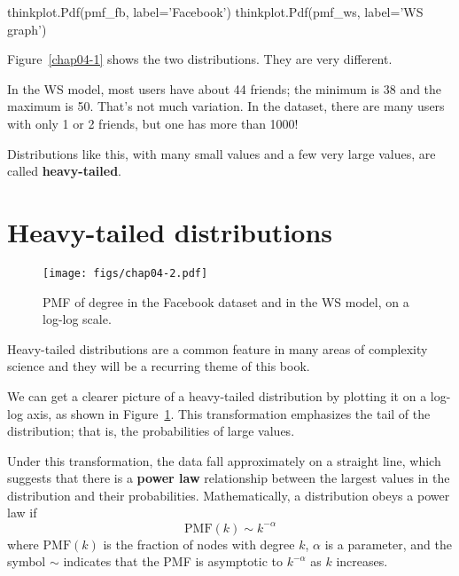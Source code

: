\documentclass[12pt]{book}
\theoremstyle{exercise}
\begin{document}
\begin{code}
thinkplot.Pdf(pmf_fb, label='Facebook')
thinkplot.Pdf(pmf_ws, label='WS graph')
\end{code}

Figure~\ref{chap04-1} shows the two distributions.  They are
very different.


In the WS model, most users have about 44 friends; the minimum is 38
and the maximum is 50.  That's not much variation.
In the dataset, there are many users with only 1 or 2 friends,
but one has more than 1000!


Distributions like this, with many small values and a few very large
values, are called {\bf heavy-tailed}.


\section{Heavy-tailed distributions}
\label{heavytail}

\begin{figure}
\centerline{\texttt{[image: figs/chap04-2.pdf]}}
\caption{PMF of degree in the Facebook dataset and in the WS model,
on a log-log scale.}
\label{chap04-2}
\end{figure}

Heavy-tailed distributions are a
common feature in many areas of complexity science and they will be a
recurring theme of this book.

We can get a clearer picture of a heavy-tailed distribution by
plotting it on a log-log axis, as shown in Figure~\ref{chap04-2}.
This transformation emphasizes the tail of the distribution; that
is, the probabilities of large values.


\newcommand{\PMF}{\mathrm{PMF}}
\newcommand{\CDF}{\mathrm{CDF}}
\newcommand{\CCDF}{\mathrm{CCDF}}

Under this transformation, the data fall approximately on a
straight line, which suggests that there is a {\bf power law}
relationship between the largest values in the distribution and their
probabilities.  Mathematically, a distribution obeys a power law if
%
\[ \PMF(k) \sim k^{-\alpha} \]
%
where $\PMF(k)$ is the fraction of nodes with degree $k$, $\alpha$
is a parameter, and the symbol $\sim$ indicates that the PMF is
asymptotic to $k^{-\alpha}$ as $k$ increases.
\end{document}
